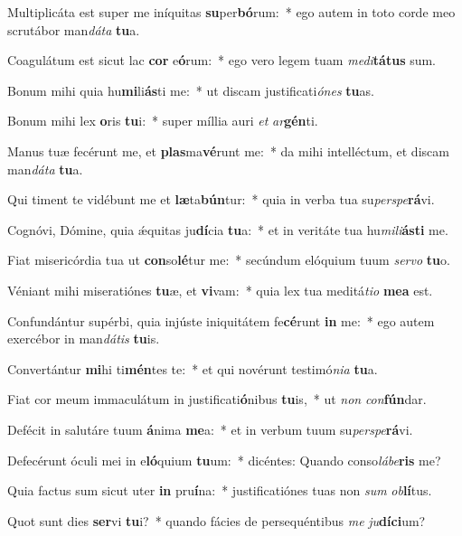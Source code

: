 \item Multiplicáta est super me iníquitas \textbf{su}per\textbf{bó}rum:~* ego autem in toto corde meo scrutábor man\textit{dá}\textit{ta} \textbf{tu}a.
\item Coagulátum est sicut lac \textbf{cor} e\textbf{ó}rum:~* ego vero legem tuam \textit{me}\textit{di}\textbf{tá}\textbf{tus} sum.
\item Bonum mihi quia hu\textbf{mi}li\textbf{ás}ti me:~* ut discam justificati\textit{ó}\textit{nes} \textbf{tu}as.
\item Bonum mihi lex \textbf{o}ris \textbf{tu}i:~* super míllia auri \textit{et} \textit{ar}\textbf{gén}ti.
\item Manus tuæ fecérunt me, et \textbf{plas}ma\textbf{vé}runt me:~* da mihi intelléctum, et discam man\textit{dá}\textit{ta} \textbf{tu}a.
\item Qui timent te vidébunt me et \textbf{læ}ta\textbf{bún}tur:~* quia in verba tua su\textit{per}\textit{spe}\textbf{rá}vi.
\item Cognóvi, Dómine, quia ǽquitas ju\textbf{dí}cia \textbf{tu}a:~* et in veritáte tua hu\textit{mi}\textit{li}\textbf{ás}\textbf{ti} me.
\item Fiat misericórdia tua ut \textbf{con}so\textbf{lé}tur me:~* secúndum elóquium tuum \textit{ser}\textit{vo} \textbf{tu}o.
\item Véniant mihi miseratiónes \textbf{tu}æ, et \textbf{vi}vam:~* quia lex tua meditá\textit{ti}\textit{o} \textbf{me}\textbf{a} est.
\item Confundántur supérbi, quia injúste iniquitátem fe\textbf{cé}runt \textbf{in} me:~* ego autem exercébor in man\textit{dá}\textit{tis} \textbf{tu}is.
\item Convertántur \textbf{mi}hi ti\textbf{mén}tes te:~* et qui novérunt testimó\textit{ni}\textit{a} \textbf{tu}a.
\item Fiat cor meum immaculátum in justificati\textbf{ó}nibus \textbf{tu}is,~* ut \textit{non} \textit{con}\textbf{fún}dar.
\item Defécit in salutáre tuum \textbf{á}nima \textbf{me}a:~* et in verbum tuum su\textit{per}\textit{spe}\textbf{rá}vi.
\item Defecérunt óculi mei in e\textbf{ló}quium \textbf{tu}um:~* dicéntes: Quando conso\textit{lá}\textit{be}\textbf{ris} me?
\item Quia factus sum sicut uter \textbf{in} pru\textbf{í}na:~* justificatiónes tuas non \textit{sum} \textit{ob}\textbf{lí}tus.
\item Quot sunt dies \textbf{ser}vi \textbf{tu}i?~* quando fácies de persequéntibus \textit{me} \textit{ju}\textbf{dí}\textbf{ci}um?

